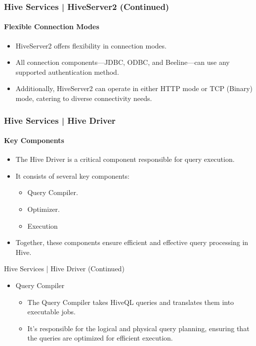 	\begin{frame}
	\frametitle{Hive Services | HiveServer2 (Continued)}
	\framesubtitle{Flexible Connection Modes}
	
	\begin{itemize}
	  \item HiveServer2 offers flexibility in connection modes.
	  \item All connection components—JDBC, ODBC, and Beeline—can use any supported authentication method.
	  \item Additionally, HiveServer2 can operate in either HTTP mode or TCP (Binary) mode, catering to diverse connectivity needs.
	\end{itemize}
	
	\end{frame}	
\begin{frame}

\frametitle{Hive Services | Hive Driver}
	\framesubtitle{Key Components}
	
	\begin{itemize}
	  \item The Hive Driver is a critical component responsible for query execution.
	  \item It consists of several key components:
		\begin{itemize}
		  \item Query Compiler.
		  \item Optimizer.
		  \item Execution
		\end{itemize}
	  \item Together, these components ensure efficient and effective query processing in Hive.
	\end{itemize}
	
	\end{frame}
\begin{frame}{Hive Services | Hive Driver (Continued)}
	\begin{itemize}
	\item Query Compiler
		\begin{itemize}
			\item The Query Compiler takes HiveQL queries and translates them into executable jobs.
			\item It's responsible for the logical and physical query planning, ensuring that the queries are optimized for efficient execution.
		\end{itemize}
\end{itemize}
\end{frame}
